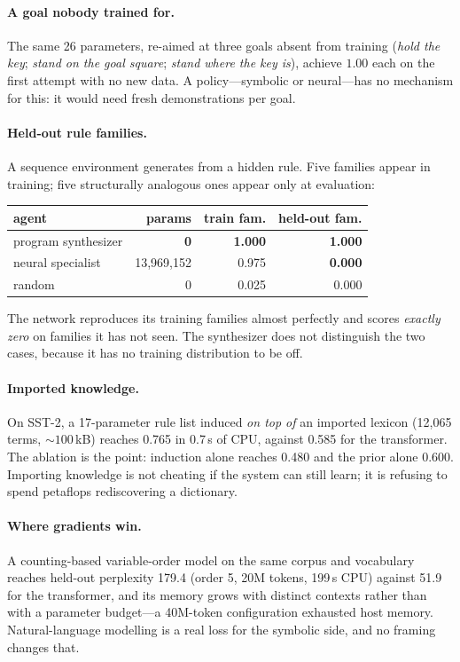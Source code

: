 \documentclass[11pt]{article}
\begin{document}
\paragraph{A goal nobody trained for.} The same 26 parameters, re-aimed at three
goals absent from training (\emph{hold the key}; \emph{stand on the goal square};
\emph{stand where the key is}), achieve $1.00$ each on the first attempt with no
new data. A policy---symbolic or neural---has no mechanism for this: it would
need fresh demonstrations per goal.

\paragraph{Held-out rule families.} A sequence environment generates from a hidden
rule. Five families appear in training; five structurally analogous ones appear
only at evaluation:

\begin{center}\small
\begin{tabular}{lrrr}
\toprule
agent & params & train fam. & held-out fam. \\
\midrule
program synthesizer & \bf 0 & \bf 1.000 & \bf 1.000 \\
neural specialist & 13{,}969{,}152 & 0.975 & \bf 0.000 \\
random & 0 & 0.025 & 0.000 \\
\bottomrule
\end{tabular}
\end{center}

\noindent The network reproduces its training families almost perfectly and
scores \emph{exactly zero} on families it has not seen. The synthesizer does not
distinguish the two cases, because it has no training distribution to be off.

\paragraph{Imported knowledge.} On SST-2, a 17-parameter rule list induced
\emph{on top of} an imported lexicon (12{,}065 terms, ${\sim}100$\,kB) reaches
0.765 in 0.7\,s of CPU, against 0.585 for the transformer. The ablation is the
point: induction alone reaches 0.480 and the prior alone 0.600. Importing
knowledge is not cheating if the system can still learn; it is refusing to spend
petaflops rediscovering a dictionary.

\paragraph{Where gradients win.} A counting-based variable-order model on the same
corpus and vocabulary reaches held-out perplexity 179.4 (order 5, 20M tokens,
199\,s CPU) against 51.9 for the transformer, and its memory grows with distinct
contexts rather than with a parameter budget---a 40M-token configuration
exhausted host memory. Natural-language modelling is a real loss for the symbolic
side, and no framing changes that.
\end{document}
